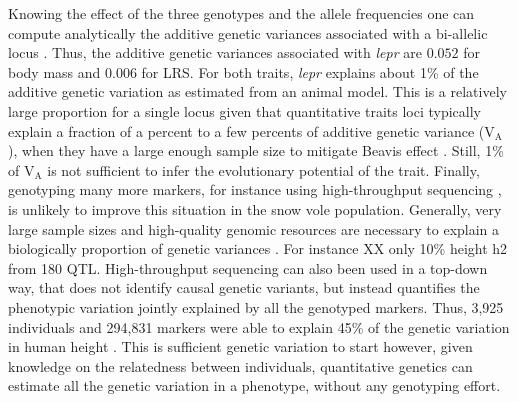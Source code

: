 Knowing the effect of the three genotypes and the allele frequencies one can compute analytically the additive genetic variances associated with a bi-allelic locus \parencite[][p77]{Fisher1941average,Lynch1998}. Thus, the additive genetic variances associated with \emph{lepr} are $0.052$  for body mass and $0.006$ for LRS. For both traits, \emph{lepr} explains about 1\% of the additive genetic variation as estimated from an animal model. This is a relatively large proportion for a single locus given that quantitative traits loci typically explain a fraction of a percent to a few percents of additive genetic variance (V$_\text{A}$), when they have a large enough sample size to mitigate Beavis effect \parencite{Flint2009,Jensen2014}.  Still, 1\% of V$_\text{A}$ is not sufficient to infer the evolutionary potential of the trait. Finally, genotyping many more markers, for instance using high-throughput sequencing \parencite{Goodwin2016}, is unlikely to improve this situation in the snow vole population. Generally, very large sample sizes and high-quality genomic resources are necessary to explain a biologically proportion of genetic variances \parencite{Bloom2013, Jensen2014}. For instance
XX only 10\% height h2 from 180 QTL.
High-throughput sequencing can also been used in a top-down way, that does not identify causal genetic variants, but instead quantifies the phenotypic variation jointly explained by all the genotyped markers. Thus, 3,925 individuals and 294,831 markers were able to explain 45\% of the genetic variation in human height \parencite{Yang2010}. This is sufficient genetic variation to start 
however, given knowledge on the relatedness between individuals, quantitative genetics can estimate all the genetic variation in a phenotype, without any genotyping effort.


